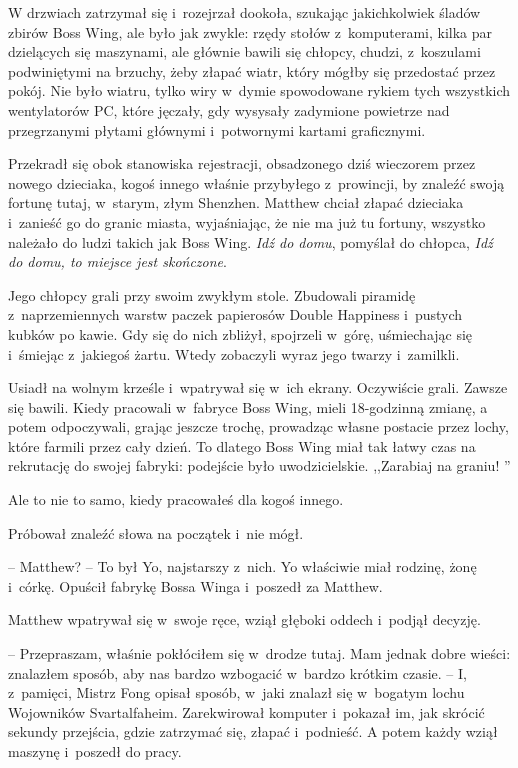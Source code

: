 \documentclass[oneside,polish,11pt,rmheadings]{mwbk}
\begin{document}
W drzwiach zatrzymał się i~rozejrzał dookoła, szukając jakichkolwiek śladów zbirów Boss Wing, ale było jak zwykle: rzędy stołów z~komputerami, kilka par dzielących się maszynami, ale głównie bawili się chłopcy, chudzi, z~koszulami podwiniętymi na brzuchy, żeby złapać wiatr, który mógłby się przedostać przez pokój. Nie było wiatru, tylko wiry w~dymie spowodowane rykiem tych wszystkich wentylatorów PC, które jęczały, gdy wysysały zadymione powietrze nad przegrzanymi płytami głównymi i~potwornymi kartami graficznymi. 


Przekradł się obok stanowiska rejestracji, obsadzonego dziś wieczorem przez nowego dzieciaka, kogoś innego właśnie przybyłego z~prowincji, by znaleźć swoją fortunę tutaj, w~starym, złym Shenzhen. Matthew chciał złapać dzieciaka i~zanieść go do granic miasta, wyjaśniając, że nie ma już tu fortuny, wszystko należało do ludzi takich jak Boss Wing. \textit{Idź do domu}, pomyślał do chłopca, \textit{Idź do domu, to miejsce jest skończone}.  


Jego chłopcy grali przy swoim zwykłym stole. Zbudowali piramidę z~naprzemiennych warstw paczek papierosów Double Happiness i~pustych kubków po kawie. Gdy się do nich zbliżył, spojrzeli w~górę, uśmiechając się i~śmiejąc z~jakiegoś żartu. Wtedy zobaczyli wyraz jego twarzy i~zamilkli. 


Usiadł na wolnym krześle i~wpatrywał się w~ich ekrany. Oczywiście grali. Zawsze się bawili. Kiedy pracowali w~fabryce Boss Wing, mieli 18-godzinną zmianę, a potem odpoczywali, grając jeszcze trochę, prowadząc własne postacie przez lochy, które farmili przez cały dzień. To dlatego Boss Wing miał tak łatwy czas na rekrutację do swojej fabryki: podejście było uwodzicielskie. ,,Zarabiaj na graniu! '' 


Ale to nie to samo, kiedy pracowałeś dla kogoś innego. 


Próbował znaleźć słowa na początek i~nie mógł. 


-- Matthew? -- To był Yo, najstarszy z~nich. Yo właściwie miał rodzinę, żonę i~córkę. Opuścił fabrykę Bossa Winga i~poszedł za Matthew. 


Matthew wpatrywał się w~swoje ręce, wziął głęboki oddech i~podjął decyzję.

 -- Przepraszam, właśnie pokłóciłem się w~drodze tutaj. Mam jednak dobre wieści: znalazłem sposób, aby nas bardzo wzbogacić w~bardzo krótkim czasie. -- I, z~pamięci, Mistrz Fong opisał sposób, w~jaki znalazł się w~bogatym lochu Wojowników Svartalfaheim. Zarekwirował komputer i~pokazał im, jak skrócić sekundy przejścia, gdzie zatrzymać się, złapać i~podnieść. A potem każdy wziął maszynę i~poszedł do pracy. 
\end{document}
